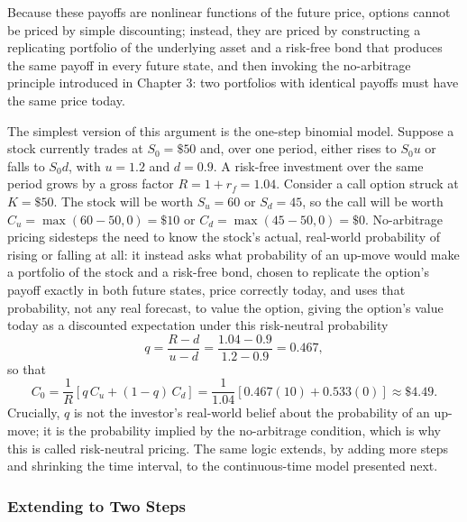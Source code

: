 \documentclass[../ai_in_finance]{subfiles}
\begin{document}
Because these payoffs are nonlinear functions of the future price, options cannot be priced by simple discounting; instead, they are priced by constructing a replicating portfolio of the underlying asset and a risk-free bond that produces the same payoff in every future state, and then invoking the no-arbitrage principle introduced in Chapter 3: two portfolios with identical payoffs must have the same price today.

The simplest version of this argument is the one-step binomial model. Suppose a stock currently trades at $S_0 = \$50$ and, over one period, either rises to $S_0 u$ or falls to $S_0 d$, with $u=1.2$ and $d=0.9$. A risk-free investment over the same period grows by a gross factor $R = 1+r_f = 1.04$. Consider a call option struck at $K=\$50$. The stock will be worth $S_u = 60$ or $S_d = 45$, so the call will be worth $C_u = \max(60-50,0) = \$10$ or $C_d = \max(45-50,0) = \$0$. No-arbitrage pricing sidesteps the need to know the stock's actual, real-world probability of rising or falling at all: it instead asks what probability of an up-move would make a portfolio of the stock and a risk-free bond, chosen to replicate the option's payoff exactly in both future states, price correctly today, and uses that probability, not any real forecast, to value the option, giving the option's value today as a discounted expectation under this risk-neutral probability
\begin{equation*}
q = \frac{R-d}{u-d} = \frac{1.04-0.9}{1.2-0.9} = 0.467,
\end{equation*}
so that
\begin{equation*}
C_0 = \frac{1}{R}[q\,C_u + (1-q)\,C_d] = \frac{1}{1.04}[0.467(10) + 0.533(0)] \approx \$4.49.
\end{equation*}
Crucially, $q$ is not the investor's real-world belief about the probability of an up-move; it is the probability implied by the no-arbitrage condition, which is why this is called risk-neutral pricing. The same logic extends, by adding more steps and shrinking the time interval, to the continuous-time model presented next.

\subsubsection*{Extending to Two Steps}
\end{document}
